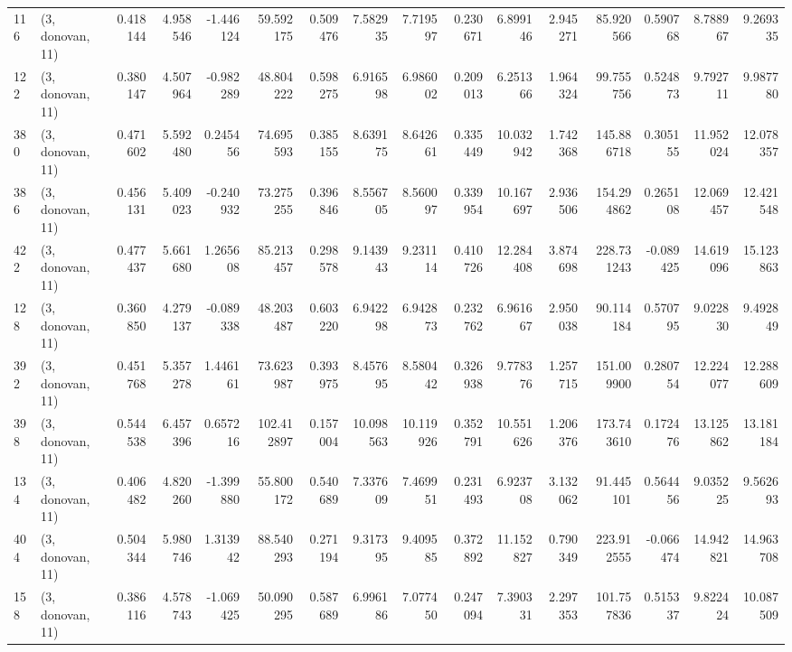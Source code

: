 \begin{tabular}{llrrrrrrrrrrrrrr}
116 &  (3, donovan, 11) &   0.418144 &   4.958546 &  -1.446124 &    59.592175 &   0.509476 &   7.582935 &   7.719597 &  0.230671 &   6.899146 &   2.945271 &    85.920566 &   0.590768 &   8.788967 &   9.269335 \\
122 &  (3, donovan, 11) &   0.380147 &   4.507964 &  -0.982289 &    48.804222 &   0.598275 &   6.916598 &   6.986002 &  0.209013 &   6.251366 &   1.964324 &    99.755756 &   0.524873 &   9.792711 &   9.987780 \\
380 &  (3, donovan, 11) &   0.471602 &   5.592480 &   0.245456 &    74.695593 &   0.385155 &   8.639175 &   8.642661 &  0.335449 &  10.032942 &   1.742368 &   145.886718 &   0.305155 &  11.952024 &  12.078357 \\
386 &  (3, donovan, 11) &   0.456131 &   5.409023 &  -0.240932 &    73.275255 &   0.396846 &   8.556705 &   8.560097 &  0.339954 &  10.167697 &   2.936506 &   154.294862 &   0.265108 &  12.069457 &  12.421548 \\
422 &  (3, donovan, 11) &   0.477437 &   5.661680 &   1.265608 &    85.213457 &   0.298578 &   9.143943 &   9.231114 &  0.410726 &  12.284408 &   3.874698 &   228.731243 &  -0.089425 &  14.619096 &  15.123863 \\
128 &  (3, donovan, 11) &   0.360850 &   4.279137 &  -0.089338 &    48.203487 &   0.603220 &   6.942298 &   6.942873 &  0.232762 &   6.961667 &   2.950038 &    90.114184 &   0.570795 &   9.022830 &   9.492849 \\
392 &  (3, donovan, 11) &   0.451768 &   5.357278 &   1.446161 &    73.623987 &   0.393975 &   8.457695 &   8.580442 &  0.326938 &   9.778376 &   1.257715 &   151.009900 &   0.280754 &  12.224077 &  12.288609 \\
398 &  (3, donovan, 11) &   0.544538 &   6.457396 &   0.657216 &   102.412897 &   0.157004 &  10.098563 &  10.119926 &  0.352791 &  10.551626 &   1.206376 &   173.743610 &   0.172476 &  13.125862 &  13.181184 \\
134 &  (3, donovan, 11) &   0.406482 &   4.820260 &  -1.399880 &    55.800172 &   0.540689 &   7.337609 &   7.469951 &  0.231493 &   6.923708 &   3.132062 &    91.445101 &   0.564456 &   9.035225 &   9.562693 \\
404 &  (3, donovan, 11) &   0.504344 &   5.980746 &   1.313942 &    88.540293 &   0.271194 &   9.317395 &   9.409585 &  0.372892 &  11.152827 &   0.790349 &   223.912555 &  -0.066474 &  14.942821 &  14.963708 \\
158 &  (3, donovan, 11) &   0.386116 &   4.578743 &  -1.069425 &    50.090295 &   0.587689 &   6.996186 &   7.077450 &  0.247094 &   7.390331 &   2.297353 &   101.757836 &   0.515337 &   9.822424 &  10.087509 \\

\end{tabular}
